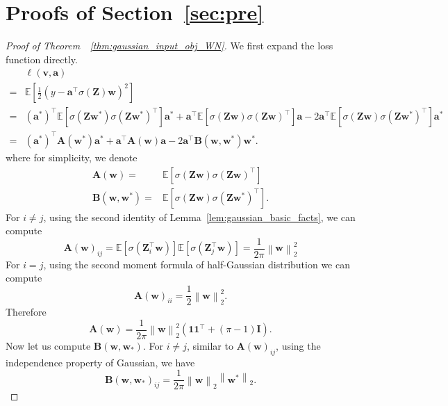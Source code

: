 \documentclass{article}
\newcommand{\firstlayer}{w}
\newcommand{\firstlayerWN}{v}
\newcommand{\secondlayer}{a}
\newcommand{\mat}[1]{\mathbf{#1}}
\newcommand{\vect}[1]{\mathbf{#1}}
\newcommand{\norm}[1]{\left\|#1\right\|}
\newcommand{\expect}{\mathbb{E}}
\newcommand{\relu}[1]{\sigma\left(#1\right)}
\begin{document}
\section{Proofs of Section~\ref{sec:pre}}
\label{sec:proof_formula}
\begin{proof}[Proof of Theorem~~\ref{thm:gaussian_input_obj_WN}]
We first expand the loss function directly.
\begin{align*}
&\ell\left(\vect{\firstlayerWN},\vect{\secondlayer}\right)\\
= &\expect\left[\frac12 \left(y-\vect{\secondlayer}^\top\relu{\mat{Z}}\vect{\firstlayer}\right)^2\right] \\
=&\left(\vect{\secondlayer}^*\right)^\top\expect\left[\relu{\mat{Z}\vect{\firstlayer}^*}\relu{\mat{Z}\vect{\firstlayer}^*}^\top\right]\vect{\secondlayer}^*
+\vect{\secondlayer}^\top\expect\left[\relu{\mat{Z}\vect{\firstlayer}}\relu{\mat{Z}\vect{\firstlayer}}^\top\right]\vect{\secondlayer} - 2\vect{\secondlayer}^\top \expect\left[\relu{\mat{Z}\vect{\firstlayer}}\relu{\mat{Z}\vect{\firstlayer}^*}^\top\right]\vect{\secondlayer}^* \\
= & \left(\vect{\secondlayer}^*\right)^\top \mat{A}\left(\vect{\firstlayer}^*\right)\vect{\secondlayer}^* + \vect{\secondlayer}^\top\mat{A}\left(\vect{\firstlayer}\right)\vect{\secondlayer} - 2\vect{\secondlayer}^\top\mat{B}\left(\vect{\firstlayer},\vect{\firstlayer}^*\right) \vect{w}^*.
\end{align*}
where for simplicity, we denote \begin{align}\mat{A}(\vect{w}) =& \expect\left[\relu{\mat{Z}\vect{w}}\relu{\mat{Z}\vect{w}}^\top\right] \label{eqn:A}\\
\mat{B}\left(\vect{w},\vect{w}^*\right) = &\expect\left[
\relu{\mat{Z}\vect{w}}\relu{\mat{Z}\vect{w}^*}^\top
\right] \label{eqn:B}.
\end{align}
For $i\neq j$, using the second identity of Lemma~\ref{lem:gaussian_basic_facts}, we can compute \[\mat{A}(\vect{w})_{ij} = \expect\left[\relu{\mat{Z}_i^\top\vect{w}}\right]\expect\left[\relu{\mat{Z}_j^\top\vect{w}}\right] = \frac{1}{2\pi}\norm{\vect{w}}_2^2\]
For $i=j$,  using the second moment formula of half-Gaussian distribution we can compute \[\mat{A}\left(\vect{w}\right)_{ii} = \frac{1}{2}\norm{\vect{w}}_2^2.\]
Therefore \[\mat{A}(\vect{w}) = \frac{1}{2\pi}\norm{\vect{w}}_2^2\left(\vect{1}\vect{1}^\top + \left(\pi-1\right)\mat{I}\right).\]
Now let us compute $\mat{B}\left(\vect{w},\vect{w}_*\right)$.
For $i\neq j$, similar to $\mat{A}(\vect{w})_{ij}$, using the independence property of Gaussian, we have \[\mat{B}\left(\vect{w},\vect{w}_*\right)_{ij} = \frac{1}{2\pi}\norm{\vect{w}}_2\norm{\vect{w}^*}_2.\]

\end{proof}
\end{document}
